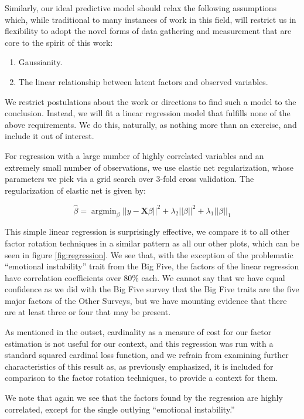 \documentclass[a4paper,12pt]{article}
\DeclareMathOperator*{\argmin}{argmin}
\begin{document}
Similarly, our ideal predictive model should relax the following assumptions which, while traditional to many instances of work in this field, will restrict us in flexibility to adopt the novel forms of data gathering and measurement that are core to the spirit of this work:

\begin{enumerate}
\item Gaussianity.
\item The linear relationship between latent factors and observed variables.
\end{enumerate}

We restrict postulations about the work or directions to find such a model to the conclusion. Instead, we will fit a linear regression model that fulfills none of the above requirements. We do this, naturally, as nothing more than an exercise, and include it out of interest.

For regression with a large number of highly correlated variables and an extremely small number of observations, we use elastic net regularization, whose parameters we pick via a grid search over 3-fold cross validation. The regularization of elastic net is given by:

$$
\hat{\beta} = \argmin_{\beta}||y - \mathbf{X}\beta ||^2 + \lambda_2|| \beta ||^2 + \lambda_1 || \beta ||_1
$$

This simple linear regression is surprisingly effective, we compare it to all other factor rotation techniques in a similar pattern as all our other plots, which can be seen in figure \ref{fig:regression}. We see that, with the exception of the problematic ``emotional instability'' trait from the Big Five, the factors of the linear regression have correlation coefficients over 80\% each. We cannot say that we have equal confidence as we did with the Big Five survey that the Big Five traits are the five major factors of the Other Surveys, but we have mounting evidence that there are at least three or four that may be present.

As mentioned in the outset, cardinality as a measure of cost for our factor estimation is not useful for our context, and this regression was run with a standard squared cardinal loss function, and we refrain from examining further characteristics of this result as, as previously emphasized, it is included for comparison to the factor rotation techniques, to provide a context for them.

We note that again we see that the factors found by the regression are highly correlated, except for the single outlying ``emotional instability.''
\end{document}
